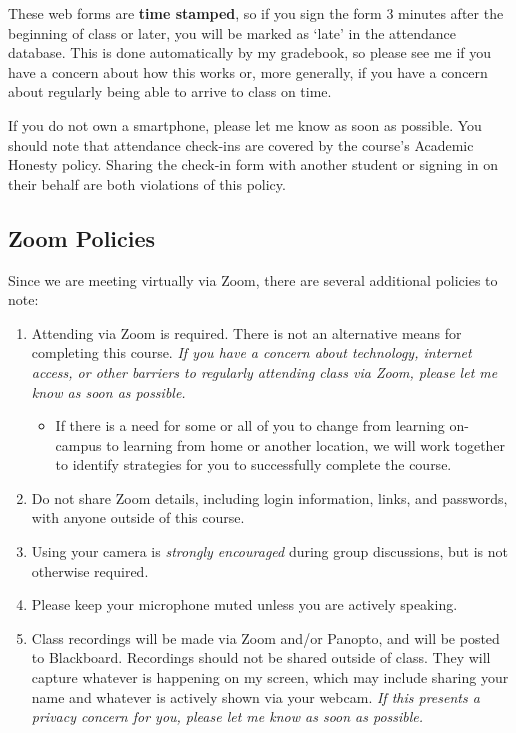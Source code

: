 \documentclass[
]{book}
\providecommand{\tightlist}{%
  \setlength{\itemsep}{0pt}\setlength{\parskip}{0pt}}
\begin{document}
These web forms are \textbf{time stamped}, so if you sign the form 3 minutes after the beginning of class or later, you will be marked as `late' in the attendance database. This is done automatically by my gradebook, so please see me if you have a concern about how this works or, more generally, if you have a concern about regularly being able to arrive to class on time.

If you do not own a smartphone, please let me know as soon as possible. You should note that attendance check-ins are covered by the course's Academic Honesty policy. Sharing the check-in form with another student or signing in on their behalf are both violations of this policy.

\hypertarget{zoom-policies}{%
\subsection{Zoom Policies}\label{zoom-policies}}

Since we are meeting virtually via Zoom, there are several additional policies to note:

\begin{enumerate}
\def\labelenumi{\arabic{enumi}.}
\tightlist
\item
  Attending via Zoom is required. There is not an alternative means for completing this course. \emph{If you have a concern about technology, internet access, or other barriers to regularly attending class via Zoom, please let me know as soon as possible.}

  \begin{itemize}
  \tightlist
  \item
    If there is a need for some or all of you to change from learning on-campus to learning from home or another location, we will work together to identify strategies for you to successfully complete the course.
  \end{itemize}
\item
  Do not share Zoom details, including login information, links, and passwords, with anyone outside of this course.
\item
  Using your camera is \emph{strongly encouraged} during group discussions, but is not otherwise required.
\item
  Please keep your microphone muted unless you are actively speaking.
\item
  Class recordings will be made via Zoom and/or Panopto, and will be posted to Blackboard. Recordings should not be shared outside of class. They will capture whatever is happening on my screen, which may include sharing your name and whatever is actively shown via your webcam. \emph{If this presents a privacy concern for you, please let me know as soon as possible.}
\end{enumerate}
\end{document}
